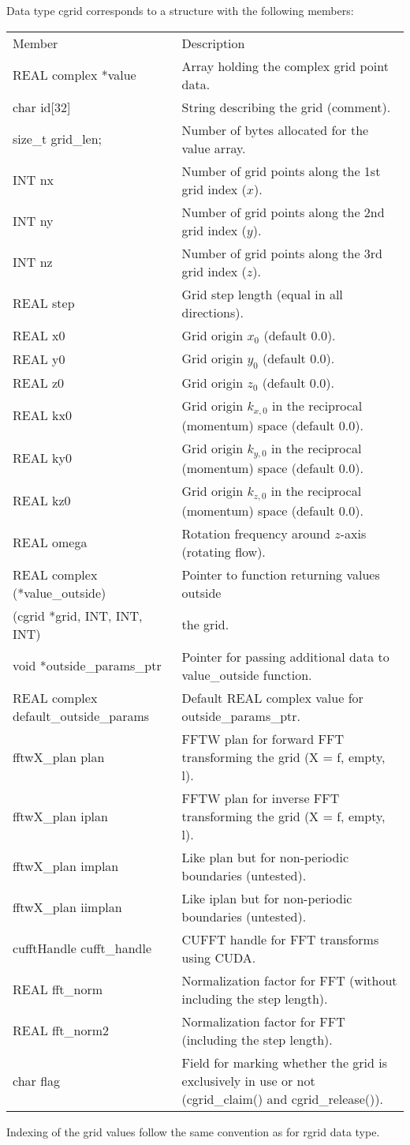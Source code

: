 \documentclass[12pt,letterpaper]{report}
\begin{document}
Data type cgrid corresponds to a structure with the following members:
\begin{longtable}{p{} p{}}
Member & Description\\
\cline{1-2}
REAL complex *value & Array holding the complex grid point data.\\
char id[32] & String describing the grid (comment).\\ 
size\_t grid\_len; & Number of bytes allocated for the value array.\\
INT nx & Number of grid points along the 1st grid index ($x$).\\
INT ny & Number of grid points along the 2nd grid index ($y$).\\
INT nz & Number of grid points along the 3rd grid index ($z$).\\
REAL step & Grid step length (equal in all directions).\\
REAL x0 & Grid origin $x_0$ (default 0.0).\\
REAL y0 & Grid origin $y_0$ (default 0.0).\\
REAL z0 & Grid origin $z_0$ (default 0.0).\\
REAL kx0 & Grid origin $k_{x,0}$ in the reciprocal (momentum) space (default 0.0).\\
REAL ky0 & Grid origin $k_{y,0}$ in the reciprocal (momentum) space (default 0.0).\\
REAL kz0 & Grid origin $k_{z,0}$ in the reciprocal (momentum) space (default 0.0).\\
REAL omega & Rotation frequency around $z$-axis (rotating flow).\\
REAL complex (*value\_outside) & Pointer to function returning values outside\\
\phantom{X}(cgrid *grid, INT, INT, INT) & the grid.\\
void *outside\_params\_ptr & Pointer for passing additional data to value\_outside function.\\
REAL complex default\_outside\_params & Default REAL complex value for outside\_params\_ptr.\\
fftwX\_plan plan & FFTW plan for forward FFT transforming the grid (X = f, empty, l).\\
fftwX\_plan iplan & FFTW plan for inverse FFT transforming the grid (X = f, empty, l).\\
fftwX\_plan implan & Like plan but for non-periodic boundaries (untested).\\
fftwX\_plan iimplan & Like iplan but for non-periodic boundaries (untested).\\
cufftHandle cufft\_handle & CUFFT handle for FFT transforms using CUDA.\\
REAL fft\_norm & Normalization factor for FFT (without including the step length).\\
REAL fft\_norm2 & Normalization factor for FFT (including the step length).\\
char flag & Field for marking whether the grid is exclusively in use or not (cgrid\_claim() and cgrid\_release()).\\
\end{longtable}
\noindent
Indexing of the grid values follow the same convention as for rgrid data type.
\end{document}
